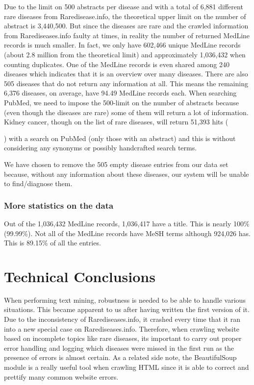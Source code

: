 Due to the limit on 500 abstracts per disease and with a total of
6,881 different rare diseases from Raredisease.info, the theoretical
upper limit on the number of abstract is 3,440,500. But since the
diseases are rare and the crawled information from Rarediseases.info
faulty at times, in reality the number of returned MedLine records is
much smaller. In fact, we only have 602,466 unique MedLine records
(about 2.8 million from the theoretical limit) and approximately
1,036,432 when counting duplicates. One of the MedLine records is even
shared among 240 diseases which indicates that it is an overview over
many diseases. There are also 505 diseases that do not return any
information at all. This means the remaining 6,376 diseases, on
average, have 94.49 MedLine records each. When searching PubMed, we
need to impose the 500-limit on the number of abstracts because (even
though the diseases are rare) some of them will return a lot of
information. Kidney cancer, though on the list of rare diseases, will
return 51,393 hits (\date{January 3, 2010}) with a search on PubMed
(only those with an abstract) and this is without considering any
synonyms or possibly handcrafted search terms.

We have chosen to remove the 505 empty disease entries from our
data set because, without any information about these diseases, our
system will be unable to find/diagnose them.

\subsubsection{More statistics on the data}
Out of the 1,036,432 MedLine records, 1,036,417 have a title. This is
nearly 100\% (99.99\%). Not all of the MedLine records have MeSH terms
although 924,026 has. This is 89.15\% of all the entries. 

\section{Technical Conclusions}

When performing text mining, robustness is needed to be able to handle
various situations. This became apparent to us after having written
the first version of it. Due to the inconsistency of
Rarediseases.info, it crashed every time that it ran into a new
special case on Rarediseases.info. Therefore, when crawling website
based on incomplete topics like rare diseases, its important to carry out
proper error handling and logging which diseases were missed in the
first run as the presence of errors is almost certain. As a related side note, the
BeautifulSoup module is a really useful tool when crawling HTML since
it is able to correct and prettify many common website errors.

